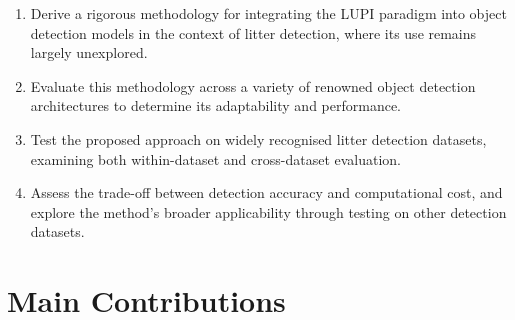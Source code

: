 \begin{enumerate}[label=\textbf{Objective (O\arabic*)}, leftmargin=*]
    \item Derive a rigorous methodology for integrating the LUPI paradigm into object detection models in the context of litter detection, where its use remains largely unexplored.
    
    \item Evaluate this methodology across a variety of renowned object detection architectures to determine its adaptability and performance.
    
    \item Test the proposed approach on widely recognised litter detection datasets, examining both within-dataset and cross-dataset evaluation.
    
    \item Assess the trade-off between detection accuracy and computational cost, and explore the method’s broader applicability through testing on other detection datasets.
\end{enumerate}

\section{Main Contributions}
\label{sec:contributions}

